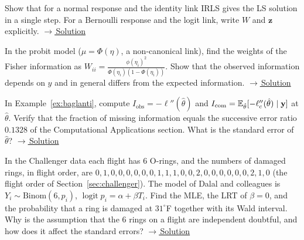 \documentclass[main.tex]{subfiles}
\begin{document}
\begin{exercise}\label{exr:23-2}
Show that for a normal response and the identity link IRLS gives the LS solution in a single step. For a Bernoulli response and the logit link, write $W$ and $\mathbf z$ explicitly.
\hfill\hyperref[coz:23-2]{\footnotesize$\rightarrow$\,Solution}
\end{exercise}

\begin{exercise}\label{exr:23-3}
In the probit model ($\mu=\Phi(\eta)$, a non-canonical link), find the weights of the Fisher information as $W_{ii}=\frac{\phi(\eta_i)^2}{\Phi(\eta_i)(1-\Phi(\eta_i))}$. Show that the observed information depends on $y$ and in general differs from the expected information.
\hfill\hyperref[coz:23-3]{\footnotesize$\rightarrow$\,Solution}
\end{exercise}

\begin{exercise}\label{exr:23-4}
In Example~\ref{ex:baglanti}, compute $I_{\text{obs}}=-\ell''(\hat\theta)$ and $I_{\text{com}}=\mathbb{E}_{\hat\theta}[-\ell_c''(\hat\theta)\mid\mathbf y]$ at $\hat\theta$. Verify that the fraction of missing information equals the successive error ratio $0.1328$ of the Computational Applications section. What is the standard error of $\hat\theta$?
\hfill\hyperref[coz:23-4]{\footnotesize$\rightarrow$\,Solution}
\end{exercise}

\begin{exercise}\label{exr:23-5}
In the Challenger data each flight has 6 O-rings, and the numbers of damaged rings, in flight order, are
$0,1,0,0,0,0,0,0,1,1,1,0,0,2,0,0,0,0,0,0,2,1,0$ (the flight order of Section~\ref{sec:challenger}). The model of Dalal and colleagues is $Y_i\sim\text{Binom}(6,p_i)$, $\operatorname{logit}p_i=\alpha+\beta T_i$. Find the MLE, the LRT of $\beta=0$, and the probability that a ring is damaged at $31^\circ$F together with its Wald interval. Why is the assumption that the 6 rings on a flight are independent doubtful, and how does it affect the standard errors?
\hfill\hyperref[coz:23-5]{\footnotesize$\rightarrow$\,Solution}
\end{exercise}

\end{document}
